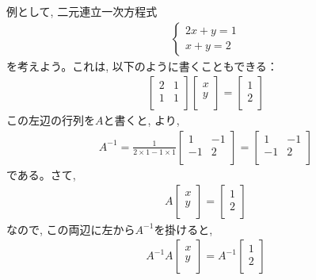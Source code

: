 例として, 二元連立一次方程式
\begin{eqnarray}\begin{cases}
2x+y=1\\
x+y=2
\end{cases}\end{eqnarray}
を考えよう。これは, 以下のように書くこともできる：
\begin{eqnarray}
\begin{bmatrix}
2 & 1 \\
1 & 1 \\
\end{bmatrix}
\begin{bmatrix}
x \\
y \\
\end{bmatrix}
=\begin{bmatrix}
1 \\
2 \\
\end{bmatrix}
\end{eqnarray}
この左辺の行列を$A$と書くと, より, 
\begin{eqnarray*}
A^{-1}=\frac{1}{2\times 1 - 1 \times 1}
\begin{bmatrix}
1 & -1 \\
-1 & 2 \\
\end{bmatrix}
=\begin{bmatrix}
1 & -1 \\
-1 & 2 \\
\end{bmatrix}
\end{eqnarray*}
である。さて, 
\begin{eqnarray}
A\begin{bmatrix}
x \\
y \\
\end{bmatrix}
=\begin{bmatrix}
1 \\
2 \\
\end{bmatrix}
\end{eqnarray}
なので, この両辺に左から$A^{-1}$を掛けると, 
\begin{eqnarray}
A^{-1}A\begin{bmatrix}
x \\
y \\
\end{bmatrix}
=A^{-1}\begin{bmatrix}
1 \\
2 \\
\end{bmatrix}
\end{eqnarray}

